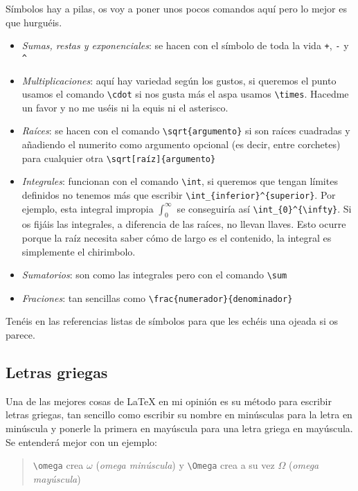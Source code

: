 Símbolos hay a pilas, os voy a poner unos pocos comandos aquí pero lo
mejor es que hurguéis.

\begin{itemize}
\item
  \emph{Sumas, restas y exponenciales}: se hacen con el símbolo de toda
  la vida \lstinline!+!, \lstinline!-! y \lstinline!^!
\item
  \emph{Multiplicaciones}: aquí hay variedad según los gustos, si
  queremos el punto usamos el comando \lstinline!\cdot! si nos gusta más
  el aspa usamos \lstinline!\times!. Hacedme un favor y no me uséis ni
  la equis ni el asterisco.
\item
  \emph{Raíces}: se hacen con el comando \lstinline!\sqrt{argumento}! si
  son raíces cuadradas y añadiendo el numerito como argumento opcional
  (es decir, entre corchetes) para cualquier otra
  \lstinline!\sqrt[raíz]{argumento}!
\item
  \emph{Integrales}: funcionan con el comando \lstinline!\int!, si
  queremos que tengan límites definidos no tenemos más que escribir
  \lstinline$\int_{inferior}^{superior}$. Por ejemplo, esta integral
  impropia \(\int_{0}^{\infty}\) se conseguiría así
  \lstinline$\int_{0}^{\infty}$. Si os fijáis las integrales, a
  diferencia de las raíces, no llevan llaves. Esto ocurre porque la raíz
  necesita saber cómo de largo es el contenido, la integral es
  simplemente el chirimbolo.
\item
  \emph{Sumatorios}: son como las integrales pero con el comando
  \lstinline!\sum!
\item
  \emph{Fraciones}: tan sencillas como
  \lstinline!\frac{numerador}{denominador}!
\end{itemize}

Tenéis en las referencias listas de símbolos para que les echéis una
ojeada si os parece.

\subsection{Letras griegas}\label{sec:letrasGriegas}

Una de las mejores cosas de LaTeX en mi opinión es su método para
escribir letras griegas, tan sencillo como escribir su nombre en
minúsculas para la letra en minúscula y ponerle la primera en mayúscula
para una letra griega en mayúscula. Se entenderá mejor con un ejemplo:

\begin{quote}
\lstinline!\omega! crea $\omega$ (\emph{omega minúscula}) y \lstinline!\Omega!
crea a su vez $\Omega$ (\emph{omega mayúscula})
\end{quote}

